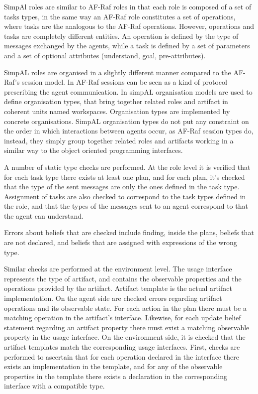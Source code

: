 \documentclass[a4paper,12pt,oneside,fleqn]{book} %
\begin{document}
SimpAl roles are similar to AF-Raf roles in that each role is composed of a
set of tasks types, in the same way an AF-Raf role constitutes a set
of operations, where tasks are the analogous to the AF-Raf operations.
However, operations and tasks are completely different entities. An
operation is defined by the type of messages exchanged by the agents, while
a task is defined by a set of parameters and a set of optional attributes
(understand, goal, pre-attributes).

SimpAL roles are organised in a slightly different manner compared to the
AF-Raf's session model. In AF-Raf sessions can be seen as a kind of protocol
prescribing the agent communication. In simpAL organisation models are used
to define organisation types, that bring together related roles and
artifact in coherent units named workspaces. Organisation types are
implemented by concrete organisations. SimpAL organisation types do not put
any constraint on the order in which interactions between agents occur, as
AF-Raf session types do, instead, they simply group together related roles
and artifacts working in a similar way to the object oriented programming
interfaces.

A number of static type checks are performed. At the role level it is
verified that for each task type there exists at least one plan, and for
each plan, it's checked that the type of the sent messages are only the ones
defined in the task type. Assignment of tasks are also checked to
correspond to the task types defined in the role, and that the types of
the messages sent to an agent correspond to that the agent can understand.

Errors about beliefs that are checked include finding, inside the plans,
beliefs that are not declared, and beliefs that are assigned with
expressions of the wrong type.

Similar checks are performed at the environment level. The usage interface
represents the type of artifact, and contains the observable properties and
the operations provided by the artifact. Artifact template is the actual
artifact implementation. On the agent side are checked errors regarding
artifact operations and its observable state. For each action in the plan
there must be a matching operation in the artifact's interface.  Likewise,
for each update belief statement regarding an artifact property there must
exist a matching observable property in the usage interface. On the
environment side, it is checked that the artifact templates match the
corresponding usage interfaces. First, checks are performed to ascertain
that for each operation declared in the interface there exists an
implementation in the template, and for any of the observable properties
in the template there exists a declaration in the corresponding interface
with a compatible type.
\end{document}
